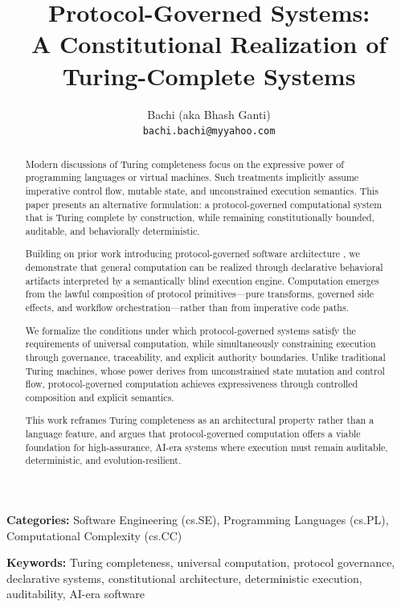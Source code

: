 \documentclass[11pt,a4paper]{article}
\title{Protocol-Governed Systems:\\A Constitutional Realization of Turing-Complete Systems}
\author{Bachi (aka Bhash Ganti)\\
\texttt{bachi.bachi@myyahoo.com}}
\date{}
\begin{document}
\maketitle

\begin{abstract}
Modern discussions of Turing completeness focus on the expressive power of programming languages or virtual machines. Such treatments implicitly assume imperative control flow, mutable state, and unconstrained execution semantics. This paper presents an alternative formulation: a protocol-governed computational system that is Turing complete by construction, while remaining constitutionally bounded, auditable, and behaviorally deterministic.

Building on prior work introducing protocol-governed software architecture \citep{bachi2026protocol}, we demonstrate that general computation can be realized through declarative behavioral artifacts interpreted by a semantically blind execution engine. Computation emerges from the lawful composition of protocol primitives---pure transforms, governed side effects, and workflow orchestration---rather than from imperative code paths.

We formalize the conditions under which protocol-governed systems satisfy the requirements of universal computation, while simultaneously constraining execution through governance, traceability, and explicit authority boundaries. Unlike traditional Turing machines, whose power derives from unconstrained state mutation and control flow, protocol-governed computation achieves expressiveness through controlled composition and explicit semantics.

This work reframes Turing completeness as an architectural property rather than a language feature, and argues that protocol-governed computation offers a viable foundation for high-assurance, AI-era systems where execution must remain auditable, deterministic, and evolution-resilient.
\end{abstract}

\noindent\textbf{Categories:} Software Engineering (cs.SE), Programming Languages (cs.PL), Computational Complexity (cs.CC)

\noindent\textbf{Keywords:} Turing completeness, universal computation, protocol governance, declarative systems, constitutional architecture, deterministic execution, auditability, AI-era software


\end{document}

